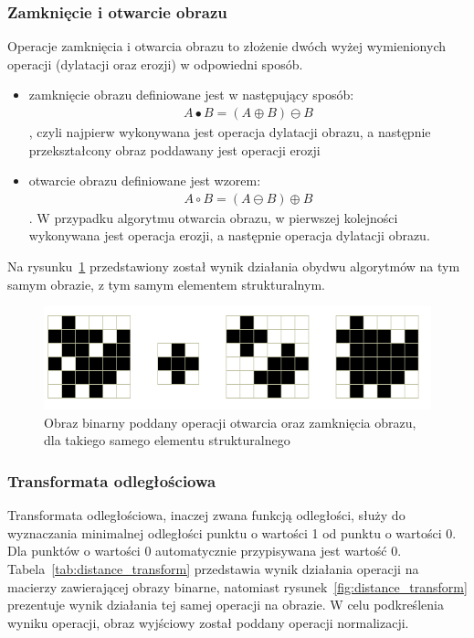 \subsubsection{Zamknięcie i otwarcie obrazu}
Operacje zamknięcia i otwarcia obrazu to złożenie dwóch wyżej wymienionych operacji (dylatacji oraz erozji) w odpowiedni sposób.
\begin{itemize}
\item zamknięcie obrazu definiowane jest w następujący sposób:
  \begin{gather*}
    A \bullet B = (A \oplus B) \ominus B
  \end{gather*}, czyli najpierw wykonywana jest operacja dylatacji obrazu, a następnie przekształcony obraz poddawany jest operacji erozji
\item otwarcie obrazu definiowane jest wzorem:
  \begin{gather*}
    A \circ B = (A \ominus B) \oplus B
  \end{gather*}. W przypadku algorytmu otwarcia obrazu, w pierwszej kolejności wykonywana jest operacja erozji, a następnie operacja dylatacji obrazu.
\end{itemize}
Na rysunku~\ref{fig:open_close} przedstawiony został wynik działania obydwu algorytmów na tym samym obrazie, z tym samym elementem strukturalnym.
\begin{figure}
  \centering
  \includegraphics[width=15cm]{img/open-close}
  \caption{Obraz binarny poddany operacji otwarcia oraz zamknięcia obrazu, dla takiego samego elementu strukturalnego}
  \label{fig:open_close}
\end{figure}
\subsubsection{Transformata odległościowa}
Transformata odległościowa, inaczej zwana funkcją odległości, służy do wyznaczania minimalnej odległości punktu o wartości 1 od punktu o wartości 0. Dla punktów o wartości 0 automatycznie przypisywana jest wartość 0. \\
Tabela~\ref{tab:distance_transform} przedstawia wynik działania operacji na macierzy zawierającej obrazy binarne, natomiast rysunek~\ref{fig:distance_transform} prezentuje wynik działania tej samej operacji na obrazie. W celu podkreślenia wyniku operacji, obraz wyjściowy został poddany operacji normalizacji.

